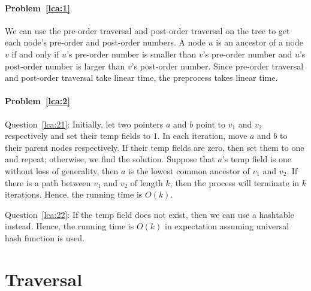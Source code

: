 \begin{Answer}
\paragraph{Problem~\ref{lca:1}}
We can use the pre-order traversal and post-order traversal on the tree to get each node's pre-order and post-order numbers. A node $u$ is an ancestor of a node $v$ if and only if $u$'s pre-order number is smaller than $v$'s pre-order number and $u$'s post-order number is larger than $v$'s post-order number. Since pre-order traversal and post-order traversal take linear time, the preprocess takes linear time.

\paragraph{Problem~\ref{lca:2}}
Question~\ref{lca:21}: Initially, let two pointers $a$ and $b$ point to $v_1$ and $v_2$ respectively and set their $\text{temp}$ fields to $1$. In each iteration, move $a$ and $b$ to their parent nodes respectively. If their $\text{temp}$ fields are zero, then set them to one and repeat; otherwise, we find the solution. Suppose that $a$'s $\text{temp}$ field is one without loss of generality, then $a$ is the lowest common ancestor of $v_1$ and $v_2$. If there is a path between $v_1$ and $v_2$ of length $k$, then the process will terminate in $k$ iterations. Hence, the running time is $O(k)$.

Question~\ref{lca:22}: If the $\text{temp}$ field does not exist, then we can use a hashtable instead. Hence, the running time is $O(k)$ in expectation assuming universal hash function is used.
\end{Answer}

\section{Traversal}
